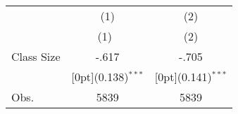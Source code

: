 \begin{tabular*}{\textwidth}{@{\extracolsep{\fill}}lcc}		
	& \multicolumn{1}{c}{(1)} &	\multicolumn{1}{c}{(2)} \\
\cline{2-3}		
	& \multicolumn{1}{c}{(1)\mbox{\ }} &	\multicolumn{1}{c}{(2)} \\
\hline		
Class Size &	-.617 &	-.705 \\
&	\raisebox{.7ex}[0pt]{\scriptsize (0.138)$^{***}$} &	\raisebox{.7ex}[0pt]{\scriptsize (0.141)$^{***}$} \\
Obs. &	5839 &	5839 \\
\hline\hline		
\end{tabular*}%
